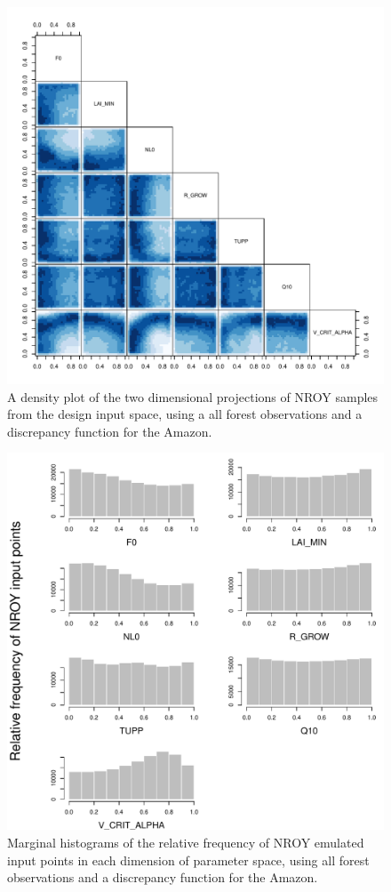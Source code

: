 \documentclass[esd, manuscript]{copernicus}
\begin{document}
\begin{figure}[t]
\includegraphics[width=12cm]{graphics/plausible_disc_input_space.pdf}
\caption{A density plot of the two dimensional projections of NROY samples from the design input space, using a all forest observations and a discrepancy function for the Amazon.}
\label{fig:plausible_disc_input_space}
\end{figure}

\begin{figure}[t]
\includegraphics[width=12cm]{graphics/input_frequency_marginal.pdf}
\caption{Marginal histograms of the relative frequency of NROY emulated input points in each dimension of parameter space, using all forest observations and a discrepancy function for the Amazon.}
\label{fig:input_frequency_marginal}
\end{figure}
\end{document}
